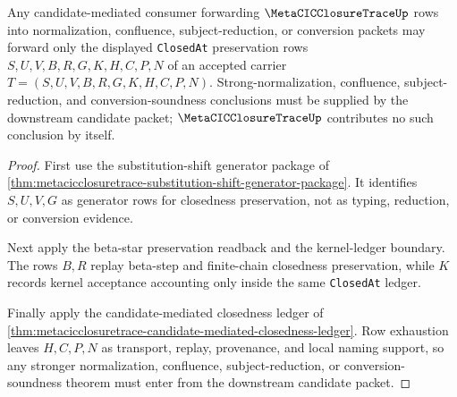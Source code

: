 \begin{theorem}
\label{thm:metacicclosuretrace-candidate-closure-forwarding}
Any candidate-mediated consumer forwarding $\MetaCICClosureTraceUp$ rows into normalization, confluence, subject-reduction, or conversion packets may forward only the displayed \texttt{ClosedAt} preservation rows $S,U,V,B,R,G,K,H,C,P,N$ of an accepted carrier $T=(S,U,V,B,R,G,K,H,C,P,N)$. Strong-normalization, confluence, subject-reduction, and conversion-soundness conclusions must be supplied by the downstream candidate packet; $\MetaCICClosureTraceUp$ contributes no such conclusion by itself.
\end{theorem}
\begin{proof}
First use the substitution-shift generator package of \autoref{thm:metacicclosuretrace-substitution-shift-generator-package}. It identifies $S,U,V,G$ as generator rows for closedness preservation, not as typing, reduction, or conversion evidence.

Next apply the beta-star preservation readback and the kernel-ledger boundary. The rows $B,R$ replay beta-step and finite-chain closedness preservation, while $K$ records kernel acceptance accounting only inside the same \texttt{ClosedAt} ledger.

Finally apply the candidate-mediated closedness ledger of \autoref{thm:metacicclosuretrace-candidate-mediated-closedness-ledger}. Row exhaustion leaves $H,C,P,N$ as transport, replay, provenance, and local naming support, so any stronger normalization, confluence, subject-reduction, or conversion-soundness theorem must enter from the downstream candidate packet.
\end{proof}

